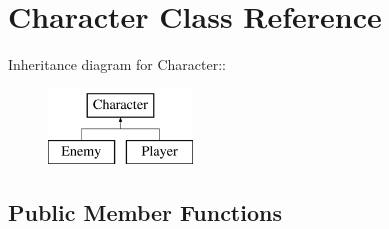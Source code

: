 \hypertarget{classCharacter}{
\section{Character Class Reference}
\label{classCharacter}
}
Inheritance diagram for Character::\begin{figure}[H]
\begin{center}
\leavevmode
\includegraphics[height=2cm]{classCharacter}
\end{center}
\end{figure}
\subsection*{Public Member Functions}
